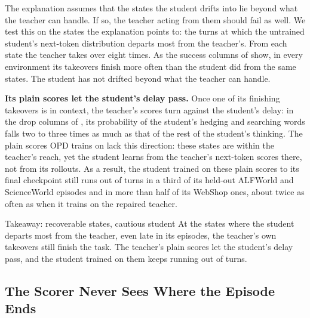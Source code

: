 The explanation assumes that the states the student drifts into lie beyond what the teacher can handle. If so, the teacher acting from them should fail as well. We test this on the states the explanation points to: the turns at which the untrained student's next-token distribution departs most from the teacher's. From each state the teacher takes over eight times. As the success columns of  show, in every environment its takeovers finish more often than the student did from the same states. The student has not drifted beyond what the teacher can handle.



\textbf{Its plain scores let the student's delay pass.} Once one of its finishing takeovers is in context, the teacher's scores turn against the student's delay: in the drop columns of , its probability of the student's hedging and searching words falls two to three times as much as that of the rest of the student's thinking. The plain scores OPD trains on lack this direction: these states are within the teacher's reach, yet the student learns from the teacher's next-token scores there, not from its rollouts. As a result, the student trained on these plain scores to its final checkpoint still runs out of turns in a third of its held-out ALFWorld and ScienceWorld episodes and in more than half of its WebShop ones, about twice as often as when it trains on the repaired teacher.

\begin{takeaway}{Takeaway: recoverable states, cautious student}
At the states where the student departs most from the teacher, even late in its episodes, the teacher's own takeovers still finish the task. The teacher's plain scores let the student's delay pass, and the student trained on them keeps running out of turns.
\end{takeaway}

\subsection{The Scorer Never Sees Where the Episode Ends}
\label{sec:myopia}

